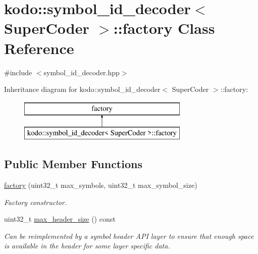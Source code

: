 \hypertarget{classkodo_1_1symbol__id__decoder_1_1factory}{\section{kodo\-:\-:symbol\-\_\-id\-\_\-decoder$<$ Super\-Coder $>$\-:\-:factory Class Reference}
\label{classkodo_1_1symbol__id__decoder_1_1factory}
}


{\ttfamily \#include $<$symbol\-\_\-id\-\_\-decoder.\-hpp$>$}

Inheritance diagram for kodo\-:\-:symbol\-\_\-id\-\_\-decoder$<$ Super\-Coder $>$\-:\-:factory\-:\begin{figure}[H]
\begin{center}
\leavevmode
\includegraphics[height=2.000000cm]{classkodo_1_1symbol__id__decoder_1_1factory}
\end{center}
\end{figure}
\subsection*{Public Member Functions}
\begin{DoxyCompactItemize}
\item 
\hyperlink{classkodo_1_1symbol__id__decoder_1_1factory_a75c7e5472f6b5604049d45d7571472ef}{factory} (uint32\-\_\-t max\-\_\-symbols, uint32\-\_\-t max\-\_\-symbol\-\_\-size)
\begin{DoxyCompactList}\small\item\em Factory constructor. \end{DoxyCompactList}\item 
uint32\-\_\-t \hyperlink{classkodo_1_1symbol__id__decoder_1_1factory_a4bf6a12c45e594f5aed39a5d079d32cc}{max\-\_\-header\-\_\-size} () const 
\begin{DoxyCompactList}\small\item\em Can be reimplemented by a symbol header A\-P\-I layer to ensure that enough space is available in the header for some layer specific data. \end{DoxyCompactList}\end{DoxyCompactItemize}


